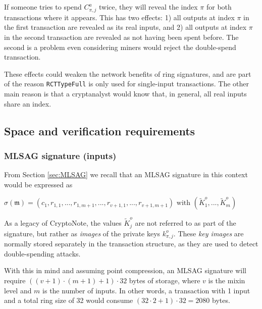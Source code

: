 If someone tries to spend $C^a_{\pi,j}$ twice, they will reveal the index $\pi$ for both transactions where it appears. This has two effects: 1) all outputs at index $\pi$ in the first transaction are revealed as its real inputs, and 2) all outputs at index $\pi$ in the second transaction are revealed as not having been spent before. The second is a problem even considering miners would reject the double-spend transaction.

These effects could weaken the network benefits of ring signatures, and are part of the reason {\tt RCTTypeFull} is only used for single-input transactions. The other main reason is that a cryptanalyst would know that, in general, all real inputs share an index.


\subsection{Space and verification requirements}
\label{subsec:space-and-ver-rcttypefull}

\subsubsection*{MLSAG signature (inputs)}

From Section \ref{sec:MLSAG} we recall that an MLSAG signature in this context would be expressed as

\hfill \(\sigma(\mathfrak{m}) = (c_1, r_{1, 1}, ..., r_{1, m+1}, ..., r_{v+1, 1}, ..., r_{v+1, m+1}) \textrm{ with } (\tilde{K}^o_1, ..., \tilde{K}^o_m) \) \hfill \phantom{.}

As a legacy of CryptoNote, the values \(\tilde{K}^o_j\) are not referred to as part of the signature, but rather as {\em images} of the private keys $k^o_{\pi,j}$. These {\em key images} are normally stored separately in the transaction structure, as they are used to detect double-spending attacks.

With this in mind and assuming point compression, an MLSAG signature will require $((v + 1) \cdot (m + 1) + 1) \cdot 32$ bytes of storage, where $v$ is the mixin level and $m$ is the number of inputs. In other words, a transaction with 1 input and a total ring size of 32 would consume $(32 \cdot 2 + 1) \cdot 32 = 2080$ bytes.

